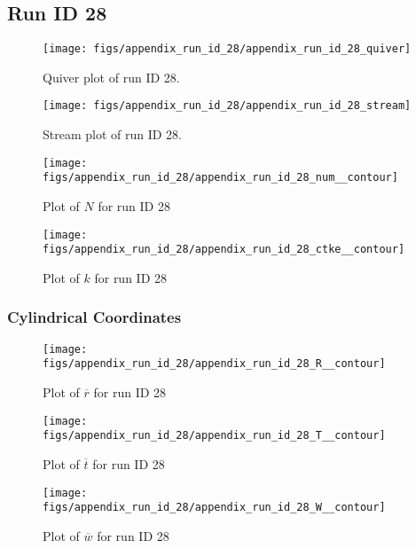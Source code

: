 \subsection{Run ID 28}
\begin{figure}[H]
\centering
\texttt{[image: figs/appendix\_run\_id\_28/appendix\_run\_id\_28\_quiver]}
\caption{Quiver plot of run ID 28.}
\label{fig:appendix_run_id_28_quiver}
\end{figure}


\begin{figure}[H]
\centering
\texttt{[image: figs/appendix\_run\_id\_28/appendix\_run\_id\_28\_stream]}
\caption{Stream plot of run ID 28.}
\label{fig:appendix_run_id_28_stream}
\end{figure}


\begin{figure}[H]
\centering
\texttt{[image: figs/appendix\_run\_id\_28/appendix\_run\_id\_28\_num\_\_contour]}
\caption{Plot of $N$ for run ID 28}
\label{fig:appendix_run_id_28_num__contour}
\end{figure}


\begin{figure}[H]
\centering
\texttt{[image: figs/appendix\_run\_id\_28/appendix\_run\_id\_28\_ctke\_\_contour]}
\caption{Plot of $k$ for run ID 28}
\label{fig:appendix_run_id_28_ctke__contour}
\end{figure}


\subsubsection{Cylindrical Coordinates}
\begin{figure}[H]
\centering
\texttt{[image: figs/appendix\_run\_id\_28/appendix\_run\_id\_28\_R\_\_contour]}
\caption{Plot of $\overline{r}$ for run ID 28}
\label{fig:appendix_run_id_28_R__contour}
\end{figure}


\begin{figure}[H]
\centering
\texttt{[image: figs/appendix\_run\_id\_28/appendix\_run\_id\_28\_T\_\_contour]}
\caption{Plot of $\overline{t}$ for run ID 28}
\label{fig:appendix_run_id_28_T__contour}
\end{figure}


\begin{figure}[H]
\centering
\texttt{[image: figs/appendix\_run\_id\_28/appendix\_run\_id\_28\_W\_\_contour]}
\caption{Plot of $\overline{w}$ for run ID 28}
\label{fig:appendix_run_id_28_W__contour}
\end{figure}



